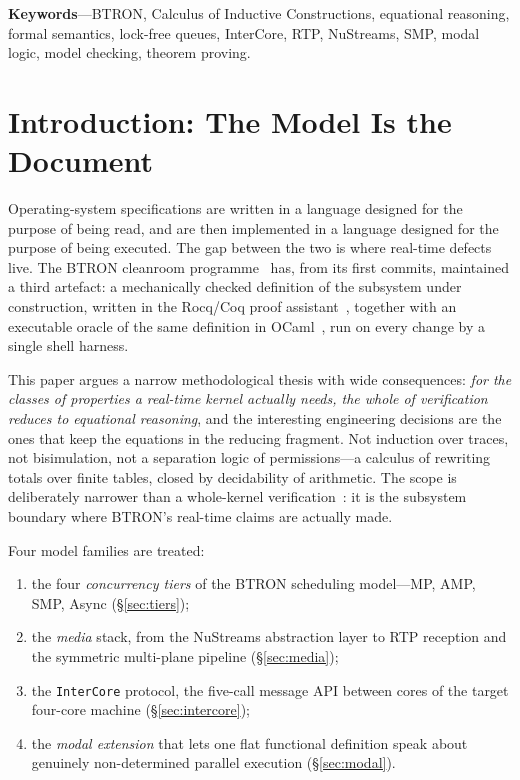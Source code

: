 \documentclass[10pt,journal,compsoc,twocolumn]{article}
\theoremstyle{definition}
\theoremstyle{remark}
\theoremstyle{plain}
\newcommand{\BTr}{\textsc{BTRON}}
\newcommand{\ctr}[1]{\texttt{#1}}
\begin{document}
\noindent\textbf{\small Keywords}---BTRON, Calculus of Inductive Constructions, equational reasoning, formal semantics, lock-free queues, InterCore, RTP, NuStreams, SMP, modal logic, model checking, theorem proving.

\section{Introduction: The Model Is the Document}
\label{sec:intro}

Operating-system specifications are written in a language designed for the purpose of being read, and are then implemented in a language designed for the purpose of being executed. The gap between the two is where real-time defects live. The \BTr{} cleanroom programme~\cite{btron3spec} has, from its first commits, maintained a third artefact: a mechanically checked definition of the subsystem under construction, written in the Rocq/Coq proof assistant~\cite{coqref,Barras97theincoq}, together with an executable oracle of the same definition in OCaml~\cite{OCaml}, run on every change by a single shell harness.

This paper argues a narrow methodological thesis with wide consequences: \emph{for the classes of properties a real-time kernel actually needs, the whole of verification reduces to equational reasoning}, and the interesting engineering decisions are the ones that keep the equations in the reducing fragment. Not induction over traces, not bisimulation, not a separation logic of permissions---a calculus of rewriting totals over finite tables, closed by decidability of arithmetic. The scope is deliberately narrower than a whole-kernel verification~\cite{klein2009sel4,sokhatsky2026btron}: it is the subsystem boundary where BTRON's real-time claims are actually made.

Four model families are treated:

\begin{enumerate}[leftmargin=*]
    \item the four \emph{concurrency tiers} of the BTRON scheduling model---MP, AMP, SMP, Async (\S\ref{sec:tiers});
    \item the \emph{media} stack, from the NuStreams abstraction layer to RTP reception and the symmetric multi-plane pipeline (\S\ref{sec:media});
    \item the \ctr{InterCore} protocol, the five-call message API between cores of the target four-core machine (\S\ref{sec:intercore});
    \item the \emph{modal extension} that lets one flat functional definition speak about genuinely non-determined parallel execution (\S\ref{sec:modal}).
\end{enumerate}
\end{document}
